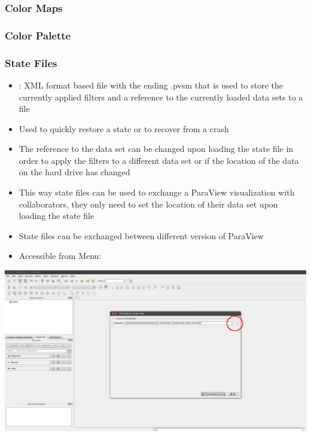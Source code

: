 \begin{frame}
  \frametitle{Color Maps}
\end{frame}

\begin{frame}
  \frametitle{Color Palette}
\end{frame}

\begin{frame}
  \frametitle{State Files}

    \begin{itemize}
      \item {}: XML format based file with the ending .pvsm that is used to store the currently applied filters and a reference to the currently loaded data sets to a file
      \item Used to quickly restore a state or to recover from a crash
      \item The reference to the data set can be changed upon loading the state file in order to apply the
        filters to a different data set or if the location of the data on the hard drive has changed
      \item This way state files can be used to exchange a ParaView visualization with collaborators, they only need to set the location of their data set upon loading the state file
      \item State files can be exchanged between different version of ParaView
      \item Accessible from Menu: 
    \end{itemize}
        

\end{frame}

\begin{frame}[plain]
  \vspace{3cm}
  \includegraphics[width=\textwidth]{screenshots/load-state-file.png}
\end{frame}

